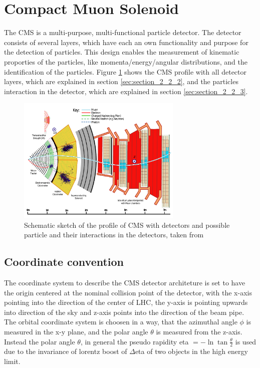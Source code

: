 \section{Compact Muon Solenoid}
\label{sec:section_2_2}

The \gls{CMS} is a multi-purpose, multi-functional particle detector. The detector consists of several layers, which have each an own functionality and purpose for the detection of particles. This design enables the measurement of kinematic proporties of the particles, like momenta/energy/angular distributions, and the identification of the particles. Figure \ref{fig:fig_2_5} shows the \gls{CMS} profile with all detector layers, which are explained in section \ref{sec:section_2_2_2}, and the particles interaction in the detector, which are explained in section \ref{sec:section_2_2_3}.

\begin{figure}[ht]
	\centering
	\includegraphics[width=0.7\textwidth]{pictures/CMS.pdf}

	\caption[Profile of CMS detector]{Schematic sketch of the profile of \gls{CMS} with detectors and possible particle and their interactions in the detectors, taken from \cite{PARTICLEFLOW}}
	\label{fig:fig_2_5}
\end{figure}


\subsection{Coordinate convention}

The coordinate system to describe the \gls{CMS} detector architeture is set to have the origin centered at the nominal collision point of the detector, with the x-axis pointing into the direction of the center of \gls{LHC}, the y-axis is pointing upwards into direction of the sky and z-axis points into the direction of the beam pipe. The orbital coordinate system is choosen in a way, that the azimuthal angle $\phi$ is measured in the x-y plane, and the polar angle $\theta$ is measured from the z-axis. Instead the polar angle $\theta$, in general the pseudo rapidity \gls{eta} $= -\ln{\tan{\frac{\theta}{2}}}$ is used due to the invariance of lorentz boost of $\Delta$\gls{eta} of two objects in the high energy limit.


